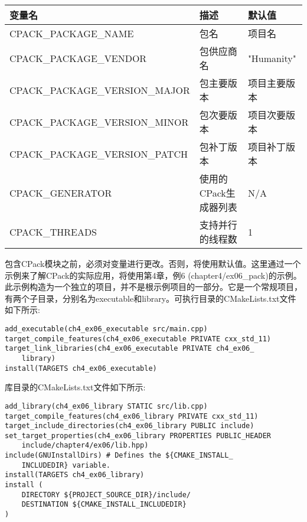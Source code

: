 \begin{table}[H]
	\centering
	\begin{tabular}{|l|l|l|}
		\hline
		\textbf{变量名}         & \textbf{描述}            & \textbf{默认值} \\ \hline
		CPACK\_PACKAGE\_NAME           & 包名                    & 项目名           \\ \hline
		CPACK\_PACKAGE\_VENDOR         & 包供应商名             & "Humanity"             \\ \hline
		CPACK\_PACKAGE\_VERSION\_MAJOR & 包主要版本           & 项目主要版本  \\ \hline
		CPACK\_PACKAGE\_VERSION\_MINOR & 包次要版本           & 项目次要版本  \\ \hline
		CPACK\_PACKAGE\_VERSION\_PATCH & 包补丁版本           & 项目补丁版本  \\ \hline
		CPACK\_GENERATOR               & 使用的CPack生成器列表 & N/A                    \\ \hline
		CPACK\_THREADS & 支持并行的线程数 & 1 \\ \hline
	\end{tabular}
\end{table}

包含CPack模块之前，必须对变量进行更改。否则，将使用默认值。这里通过一个示例来了解CPack的实际应用，将使用第4章，例6 (chapter4/ex06\_pack)的示例。此示例构造为一个独立的项目，并不是根示例项目的一部分。它是一个常规项目，有两个子目录，分别名为executable和library。可执行目录的CMakeLists.txt文件如下所示:

\begin{lstlisting}[style=styleCMake]
add_executable(ch4_ex06_executable src/main.cpp)
target_compile_features(ch4_ex06_executable PRIVATE cxx_std_11)
target_link_libraries(ch4_ex06_executable PRIVATE ch4_ex06_
	library)
install(TARGETS ch4_ex06_executable)
\end{lstlisting}

库目录的CMakeLists.txt文件如下所示:

\begin{lstlisting}[style=styleCMake]
add_library(ch4_ex06_library STATIC src/lib.cpp)
target_compile_features(ch4_ex06_library PRIVATE cxx_std_11)
target_include_directories(ch4_ex06_library PUBLIC include)
set_target_properties(ch4_ex06_library PROPERTIES PUBLIC_HEADER
	include/chapter4/ex06/lib.hpp)
include(GNUInstallDirs) # Defines the ${CMAKE_INSTALL_
	INCLUDEDIR} variable.
install(TARGETS ch4_ex06_library)
install (
	DIRECTORY ${PROJECT_SOURCE_DIR}/include/
	DESTINATION ${CMAKE_INSTALL_INCLUDEDIR}
)
\end{lstlisting}


